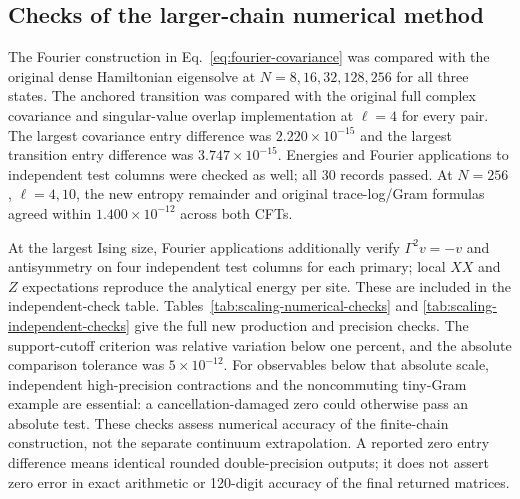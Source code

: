 \subsection{Checks of the larger-chain numerical method}
\label{sec:scaling-checks}
The Fourier construction in Eq.~\eqref{eq:fourier-covariance} was
compared with the original dense Hamiltonian eigensolve at
$N=8,16,32,128,256$ for all three states. The anchored transition was
compared with the original full complex covariance and singular-value
overlap implementation at $\ell=4$ for every pair. The largest covariance
entry difference was $2.220\!\times\!10^{-15}$ and the largest transition
entry difference was $3.747\!\times\!10^{-15}$. Energies and Fourier applications
to independent test columns were checked as well; all 30 records passed.
At $N=256$, $\ell=4,10$, the new entropy remainder and original
trace-log/Gram formulas agreed within $1.400\!\times\!10^{-12}$ across both CFTs.

At the largest Ising size, Fourier applications additionally verify
$\Gamma^2v=-v$ and antisymmetry on four independent test columns for
each primary; local $XX$ and $Z$ expectations reproduce the analytical
energy per site. These are included in the independent-check table.
Tables~\ref{tab:scaling-numerical-checks} and
\ref{tab:scaling-independent-checks} give the full new production and
precision checks. The support-cutoff criterion was relative variation
below one percent, and the absolute comparison tolerance was
$5\times10^{-12}$. For observables below that absolute scale, independent
high-precision contractions and the noncommuting tiny-Gram example are
essential: a cancellation-damaged zero could otherwise pass an absolute
test. These checks assess numerical accuracy of the finite-chain
construction, not the separate continuum extrapolation. A reported zero
entry difference means identical rounded double-precision outputs;
it does not assert zero error in exact arithmetic or 120-digit accuracy
of the final returned matrices.


